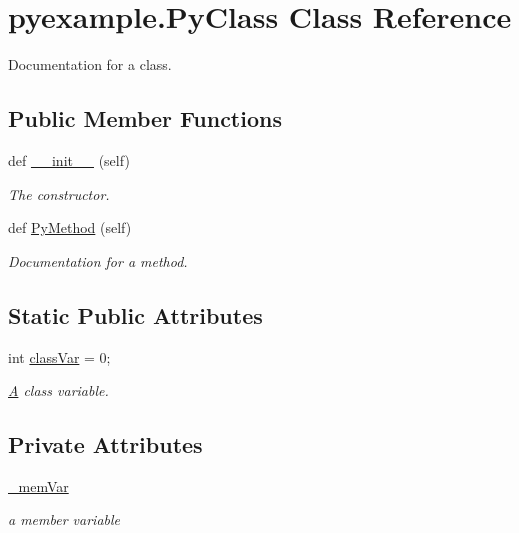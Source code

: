 \hypertarget{classpyexample_1_1_py_class}{}\section{pyexample.\+Py\+Class Class Reference}
\label{classpyexample_1_1_py_class}


Documentation for a class.  


\subsection*{Public Member Functions}
\begin{DoxyCompactItemize}
\item 
def \mbox{\hyperlink{classpyexample_1_1_py_class_a87e20fe7e81cb5a1c04e620c076ab8ac}{\+\_\+\+\_\+init\+\_\+\+\_\+}} (self)
\begin{DoxyCompactList}\small\item\em The constructor. \end{DoxyCompactList}\item 
def \mbox{\hyperlink{classpyexample_1_1_py_class_a654596774eb28a0c6d26eea565de3a9d}{Py\+Method}} (self)
\begin{DoxyCompactList}\small\item\em Documentation for a method. \end{DoxyCompactList}\end{DoxyCompactItemize}
\subsection*{Static Public Attributes}
\begin{DoxyCompactItemize}
\item 
int \mbox{\hyperlink{classpyexample_1_1_py_class_abd17aff54e5b0ca194020c796c733546}{class\+Var}} = 0;
\begin{DoxyCompactList}\small\item\em \mbox{\hyperlink{class_a}{A}} class variable. \end{DoxyCompactList}\end{DoxyCompactItemize}
\subsection*{Private Attributes}
\begin{DoxyCompactItemize}
\item 
\mbox{\hyperlink{classpyexample_1_1_py_class_a9165738cd516769e4fcd274219e9d255}{\+\_\+mem\+Var}}
\begin{DoxyCompactList}\small\item\em a member variable \end{DoxyCompactList}\end{DoxyCompactItemize}


